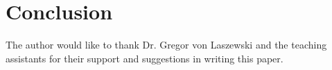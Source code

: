 \documentclass[sigconf]{acmart}
\begin{document}
\section{Conclusion}

    
\begin{acks}

The author would like to thank Dr. Gregor von Laszewski and the teaching assistants for their support and suggestions in writing this paper.

\end{acks}


 
\end{document}
